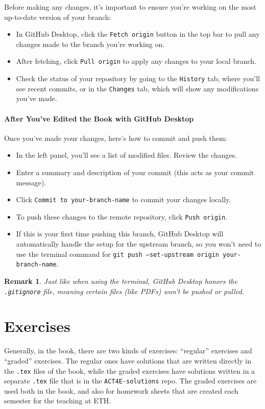 \documentclass{article}
\newtheorem{remark}{Remark}
\begin{document}
Before making any changes, it’s important to ensure you’re working on the most up-to-date version of your branch:

\begin{itemize}
    \item In GitHub Desktop, click the \texttt{Fetch origin} button in the top bar to pull any changes made to the branch you're working on.
    \item After fetching, click \texttt{Pull origin} to apply any changes to your local branch.
    \item Check the status of your repository by going to the \texttt{History} tab, where you'll see recent commits, or in the \texttt{Changes} tab, which will show any modifications you've made.
\end{itemize}

\paragraph{After You've Edited the Book with GitHub Desktop}

Once you’ve made your changes, here’s how to commit and push them:

\begin{itemize}
    \item In the left panel, you’ll see a list of modified files. Review the changes.
    \item Enter a summary and description of your commit (this acts as your commit message).
    \item Click \texttt{Commit to your-branch-name} to commit your changes locally.
    \item To push these changes to the remote repository, click \texttt{Push origin}.
    \item If this is your first time pushing this branch, GitHub Desktop will automatically handle the setup for the upstream branch, so you won’t need to use the terminal command for \texttt{git push --set-upstream origin your-branch-name}.
\end{itemize}

\begin{remark}
    Just like when using the terminal, GitHub Desktop honors the \texttt{.gitignore} file, meaning certain files (like PDFs) won’t be pushed or pulled.
\end{remark}


\section{Exercises}
Generally, in the book, there are two kinds of exercises: “regular” exercises and “graded” exercises. The regular ones have solutions that are written directly in the \texttt{.tex} files of the book, while the graded exercises have solutions written in a separate \texttt{.tex} file that is in the \texttt{ACT4E-solutions} repo. The graded exercises are used both in the book, and also for homework sheets that are created each semester for the teaching at ETH.
\end{document}
